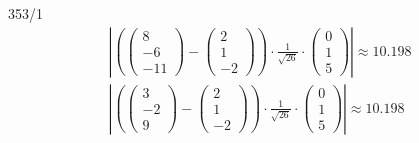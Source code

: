 \begin{exercise}{353/1}
\begin{gather*}
    \left|\left(\begin{pmatrix}8 \\ -6 \\ -11\end{pmatrix} - \begin{pmatrix}2 \\ 1 \\ -2\end{pmatrix}\right) \cdot \frac{1}{\sqrt{26}} \cdot \begin{pmatrix}0 \\ 1 \\ 5\end{pmatrix}\right| \approx 10.198 \\
    \left|\left(\begin{pmatrix}3 \\ -2 \\ 9\end{pmatrix} - \begin{pmatrix}2 \\ 1 \\ -2\end{pmatrix}\right) \cdot \frac{1}{\sqrt{26}} \cdot \begin{pmatrix}0 \\ 1 \\ 5\end{pmatrix}\right| \approx 10.198
  \end{gather*}
\end{exercise}

